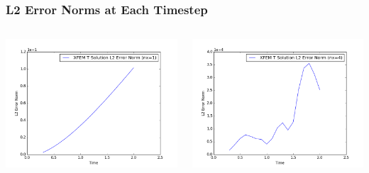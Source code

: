 \documentclass[]{beamer}
\begin{document}
\begin{frame}[t]\frametitle{L2 Error Norms at Each Timestep}
  	\begin{columns}
			\begin{center}
			\includegraphics[scale=0.3]{figures/1D_rz_ls1m/1D_rz_ls1mat_nx1_L2_Errs}
			\end{center}
			\begin{center}
			\includegraphics[scale=0.3]{figures/1D_rz_ls1m/1D_rz_ls1mat_nx4_L2_Errs}
			\end{center}
	\end{columns}
\end{frame}
\end{document}
